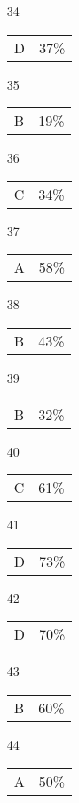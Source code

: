\documentclass{article}
\begin{document}
\begin{multicols}{4}
\begin{enumerate}
    \item[34] \begin{tabular}{cc} D & 37\%\end{tabular}
    
    \item[35] \begin{tabular}{cc} B & 19\%\end{tabular}
    
       \item[]
    
    \item[36] \begin{tabular}{cc} C & 34\%\end{tabular}
    
    \item[37] \begin{tabular}{cc} A & 58\%\end{tabular}
    
    \item[38] \begin{tabular}{cc} B & 43\%\end{tabular}
    
    \item[39] \begin{tabular}{cc} B & 32\%\end{tabular}
    
    \item[40] \begin{tabular}{cc} C & 61\%\end{tabular}
    
       \item[]
    
    \item[41] \begin{tabular}{cc} D& 73\%\end{tabular}
    
    \item[42] \begin{tabular}{cc} D & 70\%\end{tabular}
    
    \item[43] \begin{tabular}{cc} B & 60\%\end{tabular}
    
    \item[44] \begin{tabular}{cc} A & 50\%\end{tabular}
    

\end{enumerate}
\end{multicols}
\end{document}
